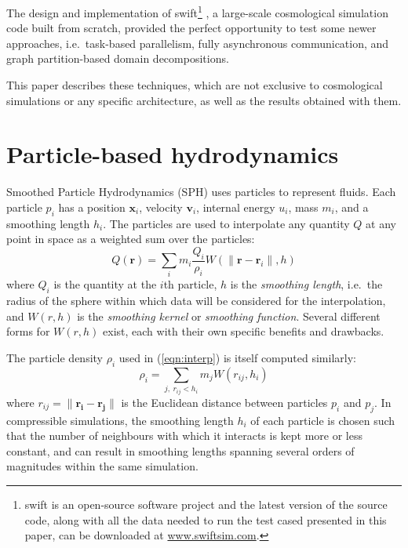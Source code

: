 \documentclass{sig-alternate-05-2015}
\newcommand{\eqn}[1] {(\ref{eqn:#1})}
\newcommand{\swift}{{\sc swift}\xspace}
\newcommand{\web}{\url{www.swiftsim.com}}
\begin{document}
The design and implementation of \swift\footnote{
\swift is an open-source software project and the latest version of
the source code, along with all the data needed to run the test cased
presented in this paper, can be downloaded at \web.}
\cite{gonnet2013swift,theuns2015swift,gonnet2015efficient}, a large-scale
cosmological simulation code built from scratch, provided the perfect
opportunity to test some newer
approaches, i.e.~task-based parallelism, fully asynchronous communication, and
graph partition-based domain decompositions.

This paper describes these techniques, which are not exclusive to
cosmological simulations or any specific architecture, as well as
the results obtained with them.



\section{Particle-based hydrodynamics}

Smoothed Particle Hydrodynamics \cite{Gingold1977,Price2012} (SPH) uses
particles to represent fluids.  Each particle $p_i$ has a position $\mathbf
x_i$, velocity $\mathbf v_i$, internal energy $u_i$, mass $m_i$, and a smoothing
length $h_i$.  The particles are used to interpolate any quantity $Q$ at any
point in space as a weighted sum over the particles:
%
\begin{equation}
    Q(\mathbf r) = \sum_i m_i \frac{Q_i}{\rho_i} W( \|\mathbf r - \mathbf r_i\| , h )
    \label{eqn:interp}
\end{equation}
%
where $Q_i$ is the quantity at the $i$th particle, $h$ is the {\em smoothing
  length}, i.e.~the radius of the sphere within which data will be considered
for the interpolation, and $W(r,h)$ is the {\em smoothing kernel} or {\em
  smoothing function}.  Several different forms for $W(r,h)$ exist, each with
their own specific benefits and drawbacks.

The particle density $\rho_i$ used in \eqn{interp} is itself computed similarly:
%
\begin{equation}
    \rho_i = \sum_{j,~r_{ij} < h_i} m_j W(r_{ij},h_i)
    \label{eqn:rho}
\end{equation}
%
where $r_{ij} = \|\mathbf{r_i}-\mathbf{r_j}\|$ is the Euclidean distance between
particles $p_i$ and $p_j$.  In compressible simulations, the smoothing length
$h_i$ of each particle is chosen such that the number of neighbours with which
it interacts is kept more or less constant, and can result in smoothing lengths
spanning several orders of magnitudes within the same simulation.
\end{document}
